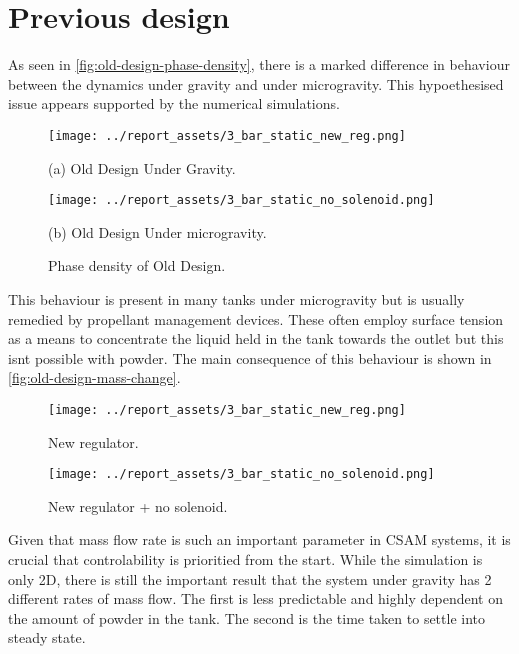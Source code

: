 \section{Previous design}\label{sec:prev-design-analysis}
As seen in \autoref{fig:old-design-phase-density}, there is a marked difference in behaviour between the dynamics under gravity and under microgravity. This hypoethesised issue appears supported by the numerical simulations.
\begin{figure}[htbp]
    \centering

    \begin{minipage}{0.45\textwidth}
        \centering
        \texttt{[image: ../report\_assets/3\_bar\_static\_new\_reg.png]}
        \caption*{(a) Old Design Under Gravity.}
    \end{minipage}
    \hfill
    \begin{minipage}{0.45\textwidth}
        \centering
        \texttt{[image: ../report\_assets/3\_bar\_static\_no\_solenoid.png]}
        \caption*{(b) Old Design Under microgravity.}
    \end{minipage}
    \caption{Phase density of Old Design.}\label{fig:old-design-phase-density}
\end{figure}
This behaviour is present in many tanks under microgravity but is usually remedied by propellant management devices. These often employ surface tension as a means to concentrate the liquid held in the tank towards the outlet but this isnt possible with powder. The main consequence of this behaviour is shown in \autoref{fig:old-design-mass-change}.
\begin{figure}[htbp]
    \centering

    \begin{minipage}{0.45\textwidth}
        \centering
        \texttt{[image: ../report\_assets/3\_bar\_static\_new\_reg.png]}
        \caption{New regulator.}
    \end{minipage}
    \hfill
    \begin{minipage}{0.45\textwidth}
        \centering
        \texttt{[image: ../report\_assets/3\_bar\_static\_no\_solenoid.png]}
        \caption{New regulator + no solenoid.}
    \end{minipage}

\end{figure}\label{fig:old-design-mass-change}
Given that mass flow rate is such an important parameter in CSAM systems, it is crucial that controlability is prioritied from the start. While the simulation is only 2D, there is still the important result that the system under gravity has 2 different rates of mass flow. The first is less predictable and highly dependent on the amount of powder in the tank. The second is the time taken to settle into steady state.
